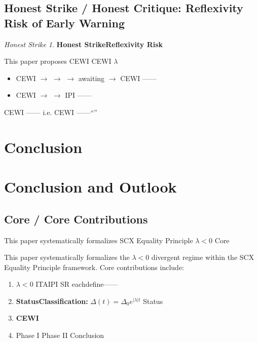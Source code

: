 \documentclass[11pt,a4paper]{article}
\theoremstyle{remark}
\newcommand{\eqtheory}{Equality Principle}
\newcommand{\ineq}{\Delta}
\newcommand{\lambdaparam}{\lambda}
\newtheorem{honestattack}{Honest Strike}
\newenvironment{attackbox}{%
  \begin{center}
  \color{red}
  \begin{minipage}{0.92\textwidth}
  \begin{honestattack}
}{%
  \end{honestattack}
  \end{minipage}
  \end{center}
}
\begin{document}
\subsection{Honest Strike / Honest Critique: Reflexivity Risk of Early Warning}

\begin{attackbox}
\textbf{Honest StrikeReflexivity Risk}

This paper proposes CEWI  CEWI 
 $\lambdaparam$ 
\begin{itemize}
    \item  CEWI  $\to$  $\to$  $\to$ awaiting
          $\to$ CEWI ——
    \item  CEWI  $\to$ 
          $\to$ IPI ——
\end{itemize}
 CEWI \textbf{}——
i.e. CEWI 
\textbf{}——``''
\end{attackbox}

\section{Conclusion}
\section{Conclusion and Outlook}

\subsection{Core / Core Contributions}

This paper systematically formalizes SCX \eqtheory{}  $\lambdaparam < 0$ 
Core

This paper systematically formalizes the $\lambdaparam < 0$ divergent regime within the
SCX \eqtheory{} framework. Core contributions include:

\begin{enumerate}
    \item \textbf{ $\lambdaparam < 0$ }
          ITAIPI SR
          eachdefine——

    \item \textbf{StatusClassification:}
           $\ineq(t) = \ineq_0 e^{|\lambdaparam| t}$ 
          Status

    \item \textbf{CEWI }
          
          

    \item \textbf{}
           Phase I  Phase II 
          Conclusion
\end{enumerate}
\end{document}
